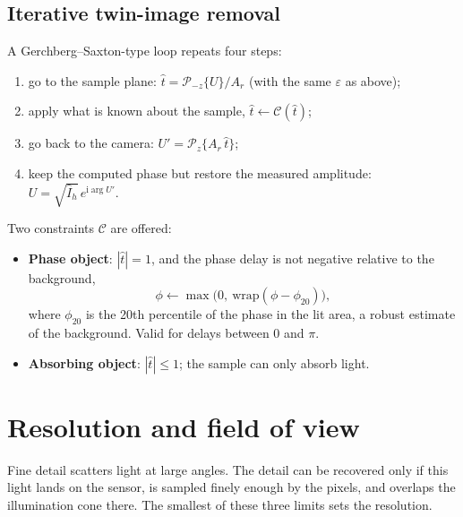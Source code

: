 \documentclass[12pt,a4paper]{article}
\newcommand{\Prop}{\mathcal{P}}
\newcommand{\ui}{\mathrm{i}}
\begin{document}
\subsection{Iterative twin-image removal}
A Gerchberg--Saxton-type loop \cite{GS,Latychevskaia} repeats four steps:
\begin{enumerate}[label=\textbf{\arabic*.}]
\item go to the sample plane: $\hat t=\Prop_{-z}\{U\}/A_r$ (with the same $\varepsilon$ as above);
\item apply what is known about the sample, $\hat t\leftarrow\mathcal{C}(\hat t)$;
\item go back to the camera: $U'=\Prop_{z}\{A_r\,\hat t\}$;
\item keep the computed phase but restore the measured amplitude: $U=\sqrt{\hat I_h}\,e^{\ui\arg U'}$.
\end{enumerate}
Two constraints $\mathcal{C}$ are offered:
\begin{itemize}
\item \textbf{Phase object}: $|\hat t|=1$, and the phase delay is not negative relative to the background,
\begin{equation}
\phi\leftarrow\max\!\big(0,\ \mathrm{wrap}(\phi-\phi_{20})\big),
\end{equation}
where $\phi_{20}$ is the 20th percentile of the phase in the lit area, a robust estimate of the background. Valid for delays between 0 and $\pi$.
\item \textbf{Absorbing object}: $|\hat t|\le1$; the sample can only absorb light.
\end{itemize}

\section{Resolution and field of view}
\label{sec:merit}

\begin{short}
Fine detail scatters light at large angles. The detail can be recovered only if this light lands
on the sensor, is sampled finely enough by the pixels, and overlaps the illumination cone there.
The smallest of these three limits sets the resolution.
\end{short}
\end{document}
